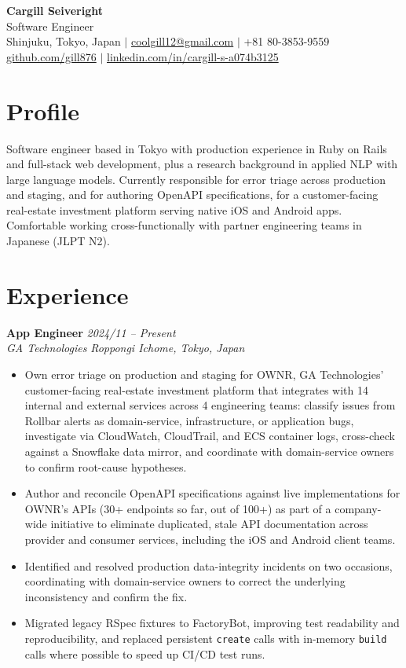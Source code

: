 \documentclass[10pt,letterpaper]{article}
\newcommand{\role}[4]{%
  \textbf{#1} \hfill \textit{#3}\\
  \textit{#2} \hfill \textit{#4}\\[0pt]
}
\begin{document}
\begin{center}
  {\LARGE \textbf{Cargill Seiveright}}\\[3pt]
  {\large Software Engineer}\\[6pt]
  \small
  Shinjuku, Tokyo, Japan \quad $\vert$ \quad
  \href{mailto:coolgill12@gmail.com}{coolgill12@gmail.com} \quad $\vert$ \quad
  +81 80-3853-9559 \\[0pt]
  \href{https://github.com/gill876}{github.com/gill876} \quad $\vert$ \quad
  \href{https://www.linkedin.com/in/cargill-s-a074b3125/}{linkedin.com/in/cargill-s-a074b3125}
\end{center}

\section*{Profile}
Software engineer based in Tokyo with production experience in Ruby on Rails and full-stack web
development, plus a research background in applied NLP with large language models. Currently
responsible for error triage across production and staging, and for authoring OpenAPI
specifications, for a customer-facing real-estate investment platform serving native iOS and
Android apps. Comfortable working cross-functionally with partner engineering teams in Japanese
(JLPT N2).

\section*{Experience}

\role{App Engineer}{GA Technologies}{2024/11 -- Present}{Roppongi Ichome, Tokyo, Japan}
\begin{itemize}
  \item Own error triage on production and staging for OWNR, GA Technologies' customer-facing
    real-estate investment platform that integrates with 14 internal and external services across
    4 engineering teams: classify issues from Rollbar alerts as domain-service, infrastructure, or
    application bugs, investigate via CloudWatch, CloudTrail, and ECS container logs, cross-check
    against a Snowflake data mirror, and coordinate with domain-service owners to confirm
    root-cause hypotheses.
  \item Author and reconcile OpenAPI specifications against live implementations for OWNR's APIs
    (30+ endpoints so far, out of 100+) as part of a company-wide initiative to eliminate
    duplicated, stale API documentation across provider and consumer services, including the iOS
    and Android client teams.
  \item Identified and resolved production data-integrity incidents on two occasions, coordinating
    with domain-service owners to correct the underlying inconsistency and confirm the fix.
  \item Migrated legacy RSpec fixtures to FactoryBot, improving test readability and
    reproducibility, and replaced persistent \texttt{create} calls with in-memory \texttt{build}
    calls where possible to speed up CI/CD test runs.
\end{itemize}
\end{document}
